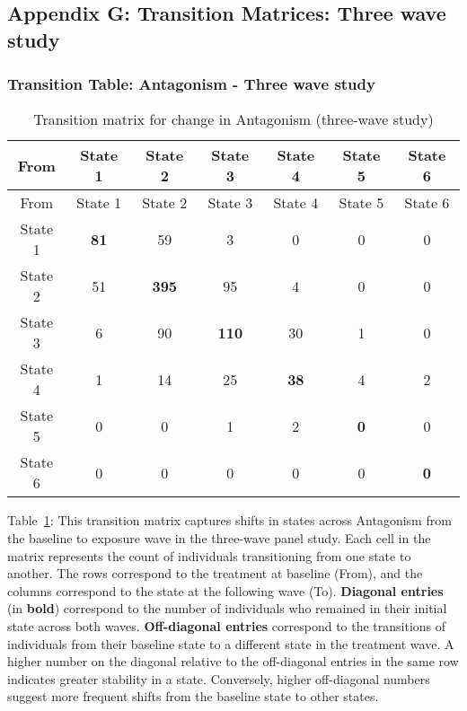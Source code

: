 \documentclass[
  single column]{article}
\begin{document}
\begin{table}
{}

\end{table}%

\newpage{}

\subsection{Appendix G: Transition Matrices: Three wave
study}\label{appendix-g-transition-matrices-three-wave-study}

\subsubsection{Transition Table: Antagonism - Three wave
study}\label{transition-table-antagonism---three-wave-study}

\begin{longtable}[]{@{}ccccccc@{}}
\caption{Transition matrix for change in Antagonism (three-wave
study)}\label{tbl-table-transition-antagonism}\tabularnewline
\toprule\noalign{}
From & State 1 & State 2 & State 3 & State 4 & State 5 & State 6 \\
\midrule\noalign{}
\endfirsthead
\toprule\noalign{}
From & State 1 & State 2 & State 3 & State 4 & State 5 & State 6 \\
\midrule\noalign{}
\endhead
\bottomrule\noalign{}
\endlastfoot
State 1 & \textbf{81} & 59 & 3 & 0 & 0 & 0 \\
State 2 & 51 & \textbf{395} & 95 & 4 & 0 & 0 \\
State 3 & 6 & 90 & \textbf{110} & 30 & 1 & 0 \\
State 4 & 1 & 14 & 25 & \textbf{38} & 4 & 2 \\
State 5 & 0 & 0 & 1 & 2 & \textbf{0} & 0 \\
State 6 & 0 & 0 & 0 & 0 & 0 & \textbf{0} \\
\end{longtable}

Table~\ref{tbl-table-transition-antagonism}: This transition matrix
captures shifts in states across Antagonism from the baseline to
exposure wave in the three-wave panel study. Each cell in the matrix
represents the count of individuals transitioning from one state to
another. The rows correspond to the treatment at baseline (From), and
the columns correspond to the state at the following wave (To).
\textbf{Diagonal entries} (in \textbf{bold}) correspond to the number of
individuals who remained in their initial state across both waves.
\textbf{Off-diagonal entries} correspond to the transitions of
individuals from their baseline state to a different state in the
treatment wave. A higher number on the diagonal relative to the
off-diagonal entries in the same row indicates greater stability in a
state. Conversely, higher off-diagonal numbers suggest more frequent
shifts from the baseline state to other states.
\end{document}
